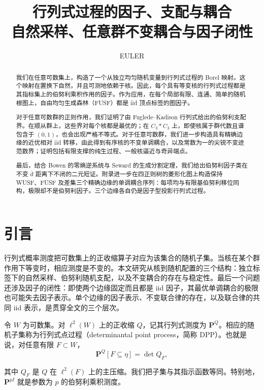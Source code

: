 \documentclass[UTF8,zihao=-4,a4paper]{ctexart}
\title{\bfseries 行列式过程的因子、支配与耦合\\[0.25em]\large 自然采样、任意群不变耦合与因子闭性}
\author{EULER}
\date{}
\numberwithin{equation}{section}
\begin{document}
\maketitle


\begin{abstract}

我们在任意可数集上，构造了一个从独立均匀随机变量到行列式过程的 Borel 映射。这个映射在置换下自然，并且可测地依赖于核。因此，每个具有等变核的行列式过程都是其指标集上的伯努利乘积作用的因子。作为应用，在每个局部有限、连通、简单的随机根图上，自由均匀生成森林（FUSF）都是 iid 顶点标签的图因子。

对于任意可数群的正则作用，我们证明了由 Fuglede--Kadison 行列式给出的伯努利支配界。在顺从群上，这些界对每个核都是最优的；在 \(C_3*C_3\) 上，即使核属于群代数且谱包含于 \((0,1)\)，也会出现严格不等式。对于任意可数群，我们进一步构造具有精确边缘的近优相对 iid 转移，由此得到有序核的不变单调耦合，以及常数为一的尖锐不变迹范数界；证明包括有限支撑的纯生过程、一般核逼近与奇异端点。

最后，结合 Bowen 的零熵逆系统与 Seward 的生成分割定理，我们给出伯努利因子类在不变 \(\bar d\) 距离下不闭的二元短证。附录进一步在四正则树的菱形化图上构造保持 WUSF、FUSF 及差集三个精确边缘的单调耦合序列：每项均与有限基伯努利移位同构，极限却不是伯努利因子。三个边缘各自仍是因子型投影行列式过程。

\end{abstract}
\begingroup
\setlength{\parskip}{0pt}
\makeatletter
\renewcommand*\l@section[2]{\@dottedtocline{1}{0em}{2.3em}{\bfseries #1}{\bfseries #2}}
\makeatother
\tableofcontents
\endgroup
\clearpage
\section{引言}\label{sec:intro}

行列式概率测度把可数集上的正收缩算子对应为该集合的随机子集。当核在某个群作用下等变时，相应测度是不变的。本文研究从核到随机配置的三个结构：独立标签下的自然采样、伯努利随机支配，以及不变耦合的存在与稳定性。最后一个问题还涉及因子的闭性：即使两个边缘固定而且都是 iid 因子，其最优单调耦合的极限也可能失去因子表示。单个边缘的因子表示、不变联合律的存在，以及联合律的共同 iid 表示，是贯穿全文的三个层次。

令 \(W\) 为可数集。对 \(\ell^2(W)\) 上的正收缩 \(Q\)，记其行列式测度为 \(\mathbf P^Q\)。相应的随机子集称为行列式点过程（determinantal point process，简称 DPP）。也就是说，对任意有限 \(F\subset W\)，
\[
 \mathbf P^Q[F\subseteq\eta]=\det Q_F,
\]

其中 \(Q_F\) 是 \(Q\) 在 \(\ell^2(F)\) 上的主压缩。我们把子集与其指示函数等同。特别地，\(\mathbf P^{pI}\) 就是参数为 \(p\) 的伯努利乘积测度。
\end{document}
